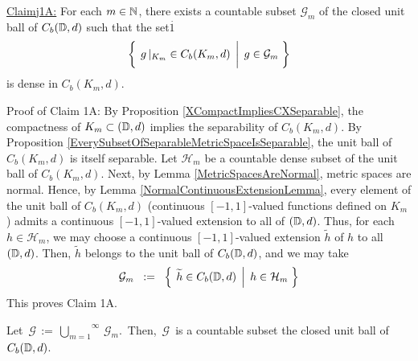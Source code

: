 \vskip 0.8cm
\begin{center}\begin{minipage}{6.5in}
\underline{Claim{{\color{white}j}}1A:}\;\;
For each $m \in \mathbb{N}$, there exists a countable subset $\mathcal{G}_{m}$
of the closed unit ball of $C_{b}(\mathbb{D},d)$ such that the set{\color{white}$\overset{.}{1}$}
\begin{equation*}
\left\{\;
	\left.
	g\,\vert_{K_{m}} \overset{{\color{white}1}}{\in} C_{b}(K_{m},d)
	\,\;\right\vert\;
	g \in \mathcal{G}_{m}
\;\right\}
\end{equation*}
is dense in $C_{b}(K_{m},d)$.
\end{minipage}\end{center}
Proof of Claim 1A:\;\;
By Proposition \ref{XCompactImpliesCXSeparable}, the compactness of
$K_{m} \subset (\mathbb{D},d)$ implies the separability of $C_{b}(K_{m},d)$.
By Proposition \ref{EverySubsetOfSeparableMetricSpaceIsSeparable},
the unit ball of $C_{b}(K_{m},d)$ is itself separable.
Let $\mathcal{H}_{m}$ be a countable dense subset of the unit ball of $C_{b}(K_{m},d)$.
Next, by Lemma \ref{MetricSpacesAreNormal}, metric spaces are normal.
Hence, by Lemma \ref{NormalContinuousExtensionLemma},
every element of the unit ball of $C_{b}(K_{m},d)$
(continuous $[-1,1]$-valued functions defined on $K_{m}$) 
admits a continuous $[-1,1]$-valued extension to all of $(\mathbb{D},d)$.
Thus, for each $h \in \mathcal{H}_{m}$, we may choose a continuous
$[-1,1]$-valued extension $\widetilde{h}$ of $h$ to all $(\mathbb{D},d)$.
Then, $\widetilde{h}$ belongs to the unit ball of $C_{b}(\mathbb{D},d)$, and we may take
\begin{equation*}
\mathcal{G}_{m}
\;\; := \;\;
	\left\{\;
	\left.
	\widetilde{h} \overset{{\color{white}.}}{\in} C_{b}(\D,d)
	\,\;\right\vert\;
	h \in \mathcal{H}_{m}
	\;\right\}
\end{equation*}
This proves Claim 1A.


\vskip 0.3cm
\noindent

\vskip 0.5cm
\noindent
Let \,$\mathcal{G} \,:=\, \overset{\infty}{\underset{m=1}{\bigcup}}\,\mathcal{G}_{m}$.\,
Then, \,$\mathcal{G}$\, is a countable subset the closed unit ball of \,$C_{b}(\mathbb{D},d)$.\,

